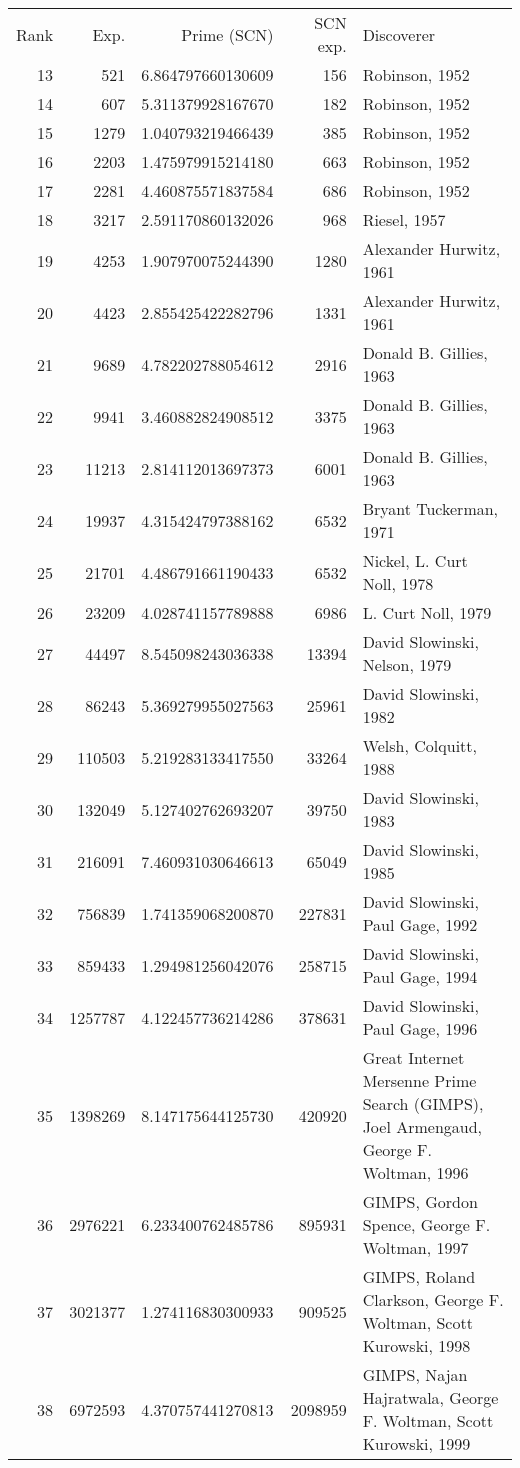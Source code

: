 \documentclass[12pt]{article}
\begin{document}
\begin{tabular}{|r|r|r|r|l|}
Rank & Exp. & Prime (SCN) & SCN exp. &  Discoverer \\
13 &  521 &  6.864797660130609 & 156 & Robinson, 1952 \\
14 &  607 &  5.311379928167670 & 182 & Robinson, 1952 \\
15 &  1279 & 1.040793219466439 & 385 & Robinson, 1952 \\
16 &  2203 & 1.475979915214180 & 663 & Robinson, 1952 \\
17 &  2281 & 4.460875571837584 & 686 & Robinson, 1952 \\
18 &  3217 & 2.591170860132026 & 968 & Riesel, 1957 \\
19 &  4253 & 1.907970075244390 & 1280 & Alexander Hurwitz, 1961 \\
20 &  4423 & 2.855425422282796 & 1331 & Alexander Hurwitz, 1961 \\
21 &  9689 & 4.782202788054612 & 2916 & Donald B. Gillies, 1963 \\
22 &  9941 & 3.460882824908512 & 3375 & Donald B. Gillies, 1963 \\
23 &  11213 &  2.814112013697373 & 6001 & Donald B. Gillies, 1963 \\
24 &  19937 &  4.315424797388162 & 6532 & Bryant Tuckerman, 1971 \\
25 &  21701 &  4.486791661190433 &  6532 & Nickel, L. Curt Noll, 1978 \\
26 &  23209 &  4.028741157789888 &  6986 & L. Curt Noll, 1979 \\
27 &  44497 &  8.545098243036338 &  13394 & David Slowinski, Nelson, 1979 \\
28 &  86243 &  5.369279955027563 &  25961 & David Slowinski, 1982 \\
29 &  110503 & 5.219283133417550 &  33264 & Welsh, Colquitt, 1988 \\
30 &  132049 & 5.127402762693207 &  39750 & David Slowinski, 1983 \\
31 &  216091 & 7.460931030646613 &  65049 & David Slowinski, 1985 \\
32 &  756839 & 1.741359068200870 &  227831 & David Slowinski, Paul Gage, 1992 \\
33 &  859433 &  1.294981256042076 &  258715 & David Slowinski, Paul Gage, 1994 \\
34 &  1257787 & 4.122457736214286 &  378631 & David Slowinski, Paul Gage, 1996 \\
35 &  1398269 & 8.147175644125730 &  420920 & Great Internet Mersenne Prime Search (GIMPS), Joel Armengaud, George F. Woltman, 1996 \\
36 &  2976221 & 6.233400762485786 &  895931 & GIMPS, Gordon Spence, George F. Woltman, 1997 \\
37 &  3021377 & 1.274116830300933 &  909525 & GIMPS, Roland Clarkson, George F. Woltman, Scott Kurowski, 1998 \\
38 &  6972593 & 4.370757441270813 &  2098959 & GIMPS, Najan Hajratwala, George F. Woltman, Scott Kurowski, 1999 \\
\end{tabular}
\end{document}
